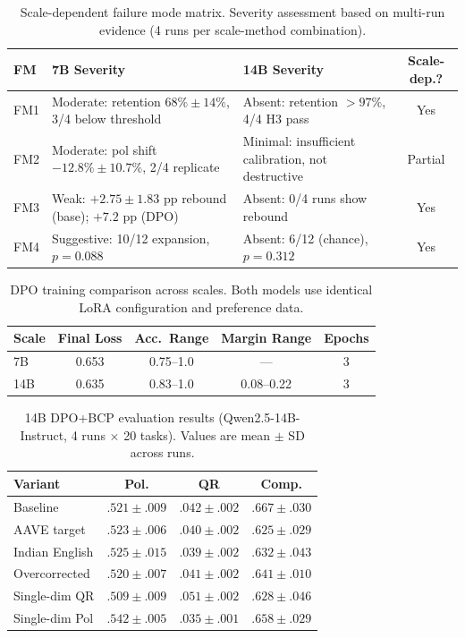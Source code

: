\documentclass[11pt,a4paper]{article}
\begin{document}
\begin{table}[t]
\centering
\caption{Scale-dependent failure mode matrix. Severity assessment based on multi-run evidence (4 runs per scale-method combination).}
\label{tab:scale-matrix}
\small
\begin{tabular}{lp{3.2cm}p{3.2cm}c}
\toprule
\textbf{FM} & \textbf{7B Severity} & \textbf{14B Severity} & \textbf{Scale-dep.?} \\
\midrule
FM1 & Moderate: retention $68\%{\pm}14\%$, 3/4 below threshold & Absent: retention ${>}97\%$, 4/4 H3 pass & Yes \\
\addlinespace
FM2 & Moderate: pol shift $-12.8\%{\pm}10.7\%$, 2/4 replicate & Minimal: insufficient calibration, not destructive & Partial \\
\addlinespace
FM3 & Weak: $+2.75{\pm}1.83$ pp rebound (base); $+7.2$ pp (DPO) & Absent: 0/4 runs show rebound & Yes \\
\addlinespace
FM4 & Suggestive: 10/12 expansion, $p{=}0.088$ & Absent: 6/12 (chance), $p{=}0.312$ & Yes \\
\bottomrule
\end{tabular}
\end{table}

\begin{table}[t]
\centering
\caption{DPO training comparison across scales. Both models use identical LoRA configuration and preference data.}
\label{tab:dpo-comparison}
\small
\begin{tabular}{lcccc}
\toprule
\textbf{Scale} & \textbf{Final Loss} & \textbf{Acc.\ Range} & \textbf{Margin Range} & \textbf{Epochs} \\
\midrule
7B & 0.653 & 0.75--1.0 & --- & 3 \\
14B & 0.635 & 0.83--1.0 & 0.08--0.22 & 3 \\
\bottomrule
\end{tabular}
\end{table}

\begin{table}[t]
\centering
\caption{14B DPO+BCP evaluation results (Qwen2.5-14B-Instruct, 4 runs $\times$ 20 tasks). Values are mean $\pm$ SD across runs.}
\label{tab:14b-dpo-results}
\small
\begin{tabular}{lccc}
\toprule
\textbf{Variant} & \textbf{Pol.} & \textbf{QR} & \textbf{Comp.} \\
\midrule
Baseline & $.521 \pm .009$ & $.042 \pm .002$ & $.667 \pm .030$ \\
AAVE target & $.523 \pm .006$ & $.040 \pm .002$ & $.625 \pm .029$ \\
Indian English & $.525 \pm .015$ & $.039 \pm .002$ & $.632 \pm .043$ \\
Overcorrected & $.520 \pm .007$ & $.041 \pm .002$ & $.641 \pm .010$ \\
Single-dim QR & $.509 \pm .009$ & $.051 \pm .002$ & $.628 \pm .046$ \\
Single-dim Pol & $.542 \pm .005$ & $.035 \pm .001$ & $.658 \pm .029$ \\
\bottomrule
\end{tabular}
\end{table}
\end{document}
